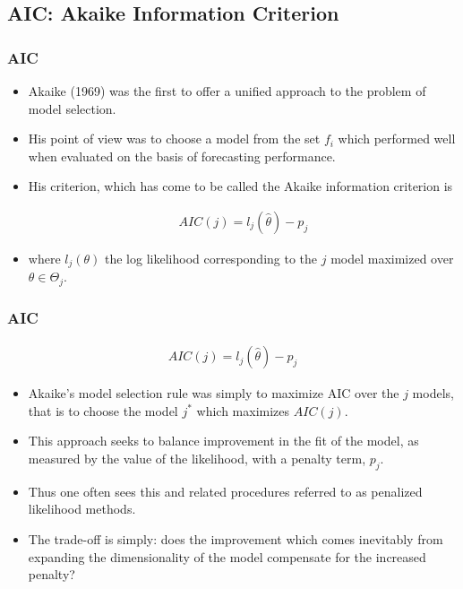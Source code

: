 \documentclass[
  shownotes,
  xcolor={svgnames},
  hyperref={colorlinks,citecolor=DarkBlue,linkcolor=DarkRed,urlcolor=DarkBlue}
  , aspectratio=169]{beamer}
\begin{document}
\subsection{AIC: Akaike Information Criterion}
\begin{frame}[fragile]
\frametitle{AIC}

\begin{itemize}

\item Akaike (1969) was the first to offer a unified approach to the problem of model selection. 

\item His point of view was to choose a model from the set ${f_i}$ which performed well when evaluated on the basis of forecasting performance. 

\item His criterion, which has come to be called the Akaike information criterion is

\begin{align}
AIC(j) = l_j(\hat \theta) - p_j
\end{align}

\item where $l_j(\theta) $ the log likelihood corresponding to the $j$ model maximized over $\theta\in\Theta_j$. 

\end{itemize}
\end{frame}

\begin{frame}[fragile]
\frametitle{AIC}

\begin{align}
AIC(j) = l_j(\hat \theta) - p_j
\end{align}
\begin{itemize}

\item Akaike’s model selection rule was simply to maximize AIC over the $j$ models, that is to choose the model $j^*$ which maximizes $AIC(j)$.

\item This approach seeks to balance improvement in the fit of the model, as measured by the value of the likelihood, with a penalty term, $p_j$. 

\item Thus one often sees this and related procedures referred to as penalized likelihood methods. 

\item The trade-off is simply: does the improvement which comes inevitably from expanding the dimensionality of the model compensate for the increased penalty?

\end{itemize}
\end{frame}
\end{document}
